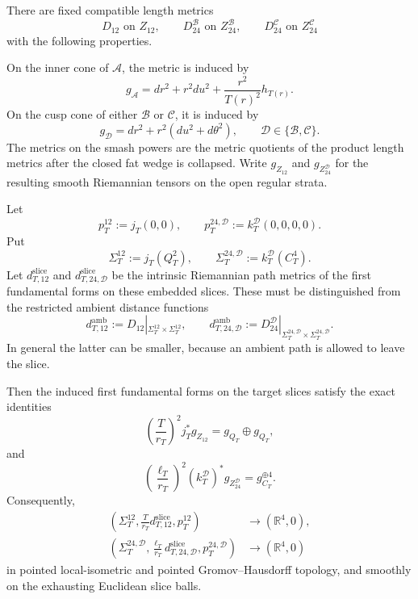 \begin{theorem}
\label{sphere-metric-fixed-realization}
There are fixed compatible length metrics
\[
 D_{12}\text{ on }Z_{12},\qquad
 D_{24}^{\mathcal B}\text{ on }Z_{24}^{\mathcal B},\qquad
 D_{24}^{\mathcal C}\text{ on }Z_{24}^{\mathcal C}
\]
with the following properties.

On the inner cone of \(\mathcal A\), the metric is induced by
\begin{equation}
 g_{\mathcal A}
 =dr^2+r^2du^2+\frac{r^2}{T(r)^2}h_{T(r)}.
 \label{sphere-metric-A-fixed-metric}
\end{equation}
On the cusp cone of either \(\mathcal B\) or \(\mathcal C\), it is induced
by
\begin{equation}
 g_{\mathcal D}=dr^2+r^2(du^2+d\theta^2),
 \qquad\mathcal D\in\{\mathcal B,\mathcal C\}.
 \label{sphere-metric-BC-fixed-metric}
\end{equation}
The metrics on the smash powers are the metric quotients of the product
length metrics after the closed fat wedge is collapsed.  Write
\(g_{Z_{12}}\) and \(g_{Z_{24}^{\mathcal D}}\) for the resulting smooth
Riemannian tensors on the open regular strata.

Let
\[
 p_T^{12}:=j_T(0,0),\qquad
 p_T^{24,\mathcal D}:=k_T^{\mathcal D}(0,0,0,0).
\]
Put
\[
 \Sigma_T^{12}:=j_T(Q_T^2),\qquad
 \Sigma_T^{24,\mathcal D}:=k_T^{\mathcal D}(C_T^4).
\]
Let \(d_{T,12}^{\mathrm{slice}}\) and
\(d_{T,24,\mathcal D}^{\mathrm{slice}}\) be the intrinsic Riemannian path
metrics of the first fundamental forms on these embedded slices.  These
must be distinguished from the restricted ambient distance functions
\[
 d_{T,12}^{\mathrm{amb}}
 :=D_{12}|_{\Sigma_T^{12}\times\Sigma_T^{12}},\qquad
 d_{T,24,\mathcal D}^{\mathrm{amb}}
 :=D_{24}^{\mathcal D}|_{\Sigma_T^{24,\mathcal D}
                         \times\Sigma_T^{24,\mathcal D}}.
\]
In general the latter can be smaller, because an ambient path is allowed
to leave the slice.

Then the induced first fundamental forms on the target slices satisfy the
exact identities
\begin{equation}
 \left(\frac{T}{r_T}\right)^2
  j_T^*g_{Z_{12}}
 =g_{Q_T}\oplus g_{Q_T},
 \label{sphere-metric-A-slice-exact}
\end{equation}
and
\begin{equation}
 \left(\frac{\ell_T}{r_T}\right)^2
  (k_T^{\mathcal D})^*g_{Z_{24}^{\mathcal D}}
 =g_{C_T}^{\oplus4}.
 \label{sphere-metric-BC-slice-exact}
\end{equation}
Consequently,
\begin{align}
 \left(\Sigma_T^{12},\frac{T}{r_T}d_{T,12}^{\mathrm{slice}},
       p_T^{12}\right)
 &\longrightarrow(\mathbb R^4,0),\\
 \left(\Sigma_T^{24,\mathcal D},
       \frac{\ell_T}{r_T}d_{T,24,\mathcal D}^{\mathrm{slice}},
       p_T^{24,\mathcal D}\right)
 &\longrightarrow(\mathbb R^4,0)
 \label{sphere-metric-slice-fixed-blowups}
\end{align}
in pointed local-isometric and pointed Gromov--Hausdorff topology, and
smoothly on the exhausting Euclidean slice balls.


\end{theorem}
